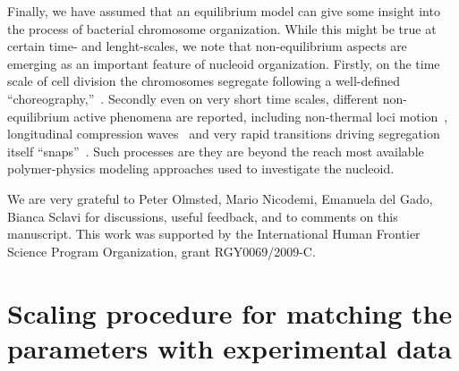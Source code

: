 \documentclass[a4paper,12pt,pre,superscriptaddress]{revtex4}
\begin{document}
Finally, we have assumed that an equilibrium model can give some
insight into the process of bacterial chromosome organization. While
this might be true at certain time- and lenght-scales, we note that
non-equilibrium aspects are emerging as an important feature of
nucleoid organization.  Firstly, on the time scale of cell division
the chromosomes segregate following a well-defined
``choreography,''~\cite{Youngren2014,Fisher2013,Kuwada2013,Toro2010}.
%
Secondly even on very short time scales, different non-equilibrium
active phenomena are reported, including non-thermal loci
motion~\cite{Weber2012a}, longitudinal compression
waves~\cite{Fisher2013} and very rapid transitions driving segregation
itself ``snaps''~\cite{Fisher2013,Joshi2011,EMB08}.  Such processes
are they are beyond the reach most available polymer-physics modeling
approaches used to investigate the nucleoid.





\begin{acknowledgments}
  We are very grateful to Peter Olmsted, Mario Nicodemi, Emanuela del
  Gado, Bianca Sclavi
  for discussions, useful feedback, and to
  comments on this manuscript.  This work was supported by the
  International Human Frontier Science Program Organization, grant
  RGY0069/2009-C.
\end{acknowledgments}



    


\appendix

\section{Scaling procedure for matching the parameters with
  experimental data}
\end{document}

